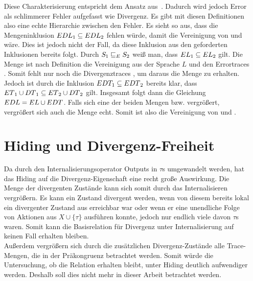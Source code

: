 Diese Charakterisierung \DaRel{} entspricht dem Ansatz
aus~\cite{Chilton2013}. Dadurch wird jedoch Error als \glqq{}schlimmerer
Fehler\grqq{} aufgefasst wie Divergenz. Es gibt mit diesen Definitionen also
eine echte Hierarchie zwischen den Fehler. Es sieht so aus, dass die
Mengeninklusion $EDL{}_1\subseteq EDL{}_2$ fehlen würde, damit \DaRel{} die
Vereinigung von \ERel{} und \DRel{} wäre. Dies ist jedoch nicht der Fall, da
diese Inklusion aus den geforderten Inklusionen bereits folgt. Durch $S_1
\sqsubseteq _E{} S_2$ weiß man, dass $EL_1 \subseteq EL_2$ gilt. Die Menge \EL{} ist
nach Definition die Vereinigung aus der Sprache $L$ und den Errortraces \ET{}.
Somit fehlt nur noch die Divergenztraces \DT{}, um daraus die Menge \EDL{} zu
erhalten. Jedoch ist durch die Inklusion $EDT_1\subseteq EDT{}_2$
bereits klar, dass $ET{}_1\cup DT{}_1 \subseteq ET{}_2\cup DT{}_2$ gilt.
Insgesamt folgt dann die Gleichung $EDL = EL \cup EDT$. Falls sich eine
der beiden Mengen \EL{} bzw. \EDT{} vergrößert, vergrößert sich auch die Menge
\EDL{} echt. Somit ist also \DaRel{} die Vereinigung von \ERel{} und \DRel{}.

\section{Hiding und Divergenz-Freiheit}

Da durch den Internalisierungsoperator Outputs in $\tau$s umgewandelt werden,
hat das Hiding auf die Divergenz-Eigenschaft eine recht große Auswirkung. Die
Menge der divergenten Zustände kann sich somit durch das Internalisieren
vergrößern. Es kann ein Zustand divergent werden, wenn von diesem bereits
lokal ein divergenter Zustand aus erreichbar war oder wenn er eine unendliche
Folge von Aktionen aus $X\cup\{\tau\}$ ausführen konnte, jedoch nur endlich
viele davon $\tau$s waren. Somit kann die Basisrelation für Divergenz unter
Internalisierung auf keinen Fall erhalten bleiben.\\
Außerdem vergrößern sich durch die zusätzlichen Divergenz-Zustände alle
Trace-Mengen, die in der Präkongruenz \DRel{} betrachtet werden. Somit würde
die Untersuchung, ob die Relation erhalten bleibt, unter Hiding deutlich
aufwendiger werden. Deshalb soll dies nicht mehr in dieser Arbeit betrachtet
werden.
